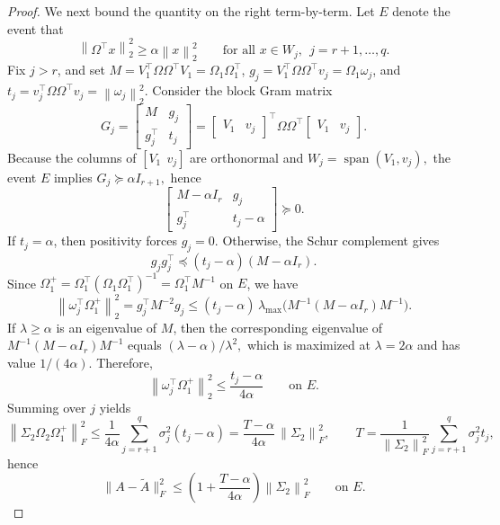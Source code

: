 \documentclass[onefignum,onetabnum]{siamart251216}
\newcommand{\norm}[1]{\left\lVert #1 \right\rVert}
\begin{document}
\begin{proof}
We next bound the quantity on the right term-by-term. Let $E$ denote the event that
\[
\norm{\Omega^\top x}_2^2 \ge \alpha \norm{x}_2^2
\qquad \text{for all } x\in W_j,\ \ j=r+1,\dots,q.
\] Fix $j>r$, and set
$
M = V_1^\top\Omega\Omega^\top V_1 = \Omega_1\Omega_1^\top$, $g_j = V_1^\top\Omega\Omega^\top v_j = \Omega_1\omega_j$, and $ t_j = v_j^\top\Omega\Omega^\top v_j = \norm{\omega_j}_2^2$.  Consider the block Gram matrix
\[
G_j
=
\begin{bmatrix}
M & g_j\\
g_j^\top & t_j
\end{bmatrix}
=
\begin{bmatrix}
V_1 & v_j
\end{bmatrix}^\top
\Omega\Omega^\top
\begin{bmatrix}
V_1 & v_j
\end{bmatrix}.
\]
Because the columns of $[V_1\ \ v_j]$ are orthonormal and
$
W_j = \operatorname{span}(V_1,v_j),
$
the event $E$ implies
$
G_j \succeq \alpha I_{r+1},
$
hence
\[
\begin{bmatrix}
M-\alpha I_r & g_j\\
g_j^\top & t_j-\alpha
\end{bmatrix}
\succeq 0.
\]
If $t_j=\alpha$, then positivity forces $g_j=0$.  Otherwise, the Schur complement gives
\[
g_jg_j^\top \preceq (t_j-\alpha)(M-\alpha I_r).
\]
Since $\Omega_1^+=\Omega_1^\top(\Omega_1\Omega_1^\top)^{-1}=\Omega_1^\top M^{-1}$ on $E$, we have
\[
\norm{\omega_j^\top\Omega_1^+}_2^2
=
g_j^\top M^{-2}g_j
\le
(t_j-\alpha)\,
\lambda_{\max}\!\bigl(M^{-1}(M-\alpha I_r)M^{-1}\bigr).
\]
If $\lambda\ge \alpha$ is an eigenvalue of $M$, then the corresponding eigenvalue of
$
M^{-1}(M-\alpha I_r)M^{-1}
$
equals
$
(\lambda-\alpha)/\lambda^2,
$
which is maximized at $\lambda=2\alpha$ and has value $1/(4\alpha)$.  Therefore,
\[
\norm{\omega_j^\top\Omega_1^+}_2^2 \le \frac{t_j-\alpha}{4\alpha}
\qquad \text{on } E.
\]
Summing over $j$ yields
\[
\norm{\Sigma_2\Omega_2\Omega_1^+}_F^2
\le
\frac{1}{4\alpha}\sum_{j=r+1}^q \sigma_j^2(t_j-\alpha) = \frac{T-\alpha}{4\alpha}\,\norm{\Sigma_2}_F^2,\qquad T
=
\frac{1}{\norm{\Sigma_2}_F^2}
\sum_{j=r+1}^q \sigma_j^2 t_j,
\]
hence
\[
\|A-\widetilde A\|_F^2
\le
\left(1+\frac{T-\alpha}{4\alpha}\right)\norm{\Sigma_2}_F^2
\qquad \text{on } E.
\]


\end{proof}
\end{document}
